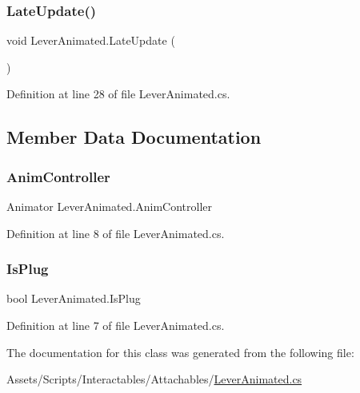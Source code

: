 \subsubsection{\texorpdfstring{Late\+Update()}{LateUpdate()}}
{\footnotesize\ttfamily void Lever\+Animated.\+Late\+Update (\begin{DoxyParamCaption}{ }\end{DoxyParamCaption})}



Definition at line 28 of file Lever\+Animated.\+cs.



\subsection{Member Data Documentation}
\mbox{\label{class_lever_animated_abbc4dcc302c3fe4eebd533d07d62cd60}} 
\subsubsection{\texorpdfstring{Anim\+Controller}{AnimController}}
{\footnotesize\ttfamily Animator Lever\+Animated.\+Anim\+Controller}



Definition at line 8 of file Lever\+Animated.\+cs.

\mbox{\label{class_lever_animated_acef00a2288f01bca348805839a58fe0f}} 
\subsubsection{\texorpdfstring{Is\+Plug}{IsPlug}}
{\footnotesize\ttfamily bool Lever\+Animated.\+Is\+Plug}



Definition at line 7 of file Lever\+Animated.\+cs.



The documentation for this class was generated from the following file\+:\begin{DoxyCompactItemize}
\item 
Assets/\+Scripts/\+Interactables/\+Attachables/\mbox{\hyperlink{_lever_animated_8cs}{Lever\+Animated.\+cs}}\end{DoxyCompactItemize}
